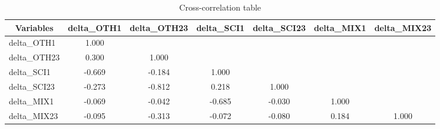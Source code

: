 \begin{table}[htbp]\centering \caption{Cross-correlation table\label{corrtable}}
\begin{tabular}{l  c  c  c  c  c  c }\hline\hline
\multicolumn{1}{c}{Variables} &delta\_OTH1&delta\_OTH23&delta\_SCI1&delta\_SCI23&delta\_MIX1&delta\_MIX23\\ \hline
delta\_OTH1&1.000\\
delta\_OTH23&0.300&1.000\\
delta\_SCI1&-0.669&-0.184&1.000\\
delta\_SCI23&-0.273&-0.812&0.218&1.000\\
delta\_MIX1&-0.069&-0.042&-0.685&-0.030&1.000\\
delta\_MIX23&-0.095&-0.313&-0.072&-0.080&0.184&1.000\\
\hline \hline 
 \end{tabular}
\end{table}
